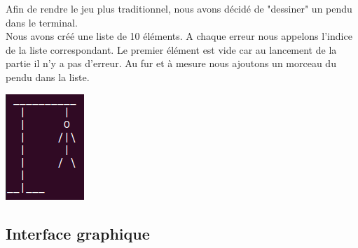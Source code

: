 \documentclass[french,10pt,a4paper]{article}	%
\begin{document}
	
	\begin{minipage}{.6\textwidth}
	Afin de rendre le jeu plus traditionnel, nous avons décidé de "dessiner" un pendu dans le terminal.\\	
	Nous avons créé une liste de 10 éléments. A chaque erreur nous appelons l'indice de la liste correspondant. Le premier élément est vide car au lancement de la partie il n'y a pas d'erreur. Au fur et à mesure nous ajoutons un morceau du pendu dans la liste. 	
	\end{minipage}		
	\hfill	
	\begin{minipage}{.27\textwidth}		%
	\includegraphics[width=\textwidth]{penduascii.png}	%
	\end{minipage}
	
	\subsection{Interface graphique}
	
\end{document}
